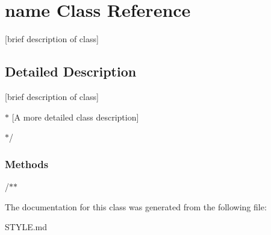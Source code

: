 \hypertarget{classname}{\section{name Class Reference}
\label{classname}
}


\mbox{[}brief description of class\mbox{]}
\begin{DoxyItemize}
\item 
\end{DoxyItemize} 




\subsection{Detailed Description}
\mbox{[}brief description of class\mbox{]}
\begin{DoxyItemize}
\item 
\end{DoxyItemize}


\begin{DoxyItemize}
\item 
\item $\ast$ \mbox{[}A more detailed class description\mbox{]}
\item $\ast$/
\end{DoxyItemize}

\subsubsection*{Methods }

/$\ast$$\ast$ 

The documentation for this class was generated from the following file\-:\begin{DoxyCompactItemize}
\item 
S\-T\-Y\-L\-E.\-md\end{DoxyCompactItemize}
